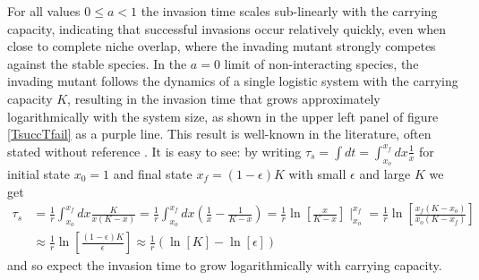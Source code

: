 For all values $0\leq a<1$ the invasion time scales sub-linearly with the carrying capacity, indicating that successful invasions occur relatively quickly, even when close to complete niche overlap, where the invading mutant strongly competes against the stable species. 
In the $a=0$ limit of non-interacting species, the invading mutant follows the dynamics of a single logistic system with the carrying capacity $K$, resulting in the invasion time that grows approximately logarithmically with the system size, as shown in the upper left panel of figure \ref{TsuccTfail} as a purple line. 
This result is well-known in the literature, often stated without reference \cite{Lande1993,Parsons2018}. 
It is easy to see: by writing $\tau_s = \int dt = \int_{x_o}^{x_f} dx \frac{1}{\dot{x}}$ for initial state $x_0=1$ and final state $x_f=(1-\epsilon)K$ with small $\epsilon$ and large $K$ we get
\begin{align*}
\tau_s &= \frac{1}{r}\int_{x_o}^{x_f} dx \frac{K}{x(K-x)} = \frac{1}{r}\int_{x_o}^{x_f} dx \left(\frac{1}{x}-\frac{1}{K-x} \right) = \frac{1}{r}\ln\left[\frac{x}{K-x} \right]\mid_{x_o}^{x_f} = \frac{1}{r}\ln\left[\frac{x_f(K-x_o)}{x_o(K-x_f)} \right] \\
	   &\approx \frac{1}{r}\ln\left[\frac{(1-\epsilon)K}{\epsilon} \right] \approx \frac{1}{r}\left(\ln\left[K\right]-\ln\left[\epsilon\right]\right)
\end{align*}
and so expect the invasion time to grow logarithmically with carrying capacity. 

